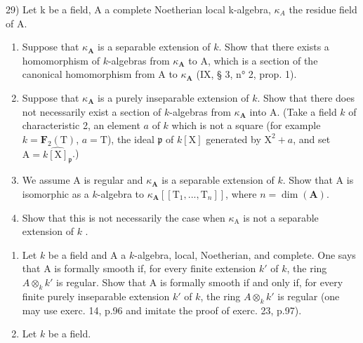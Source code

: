 29) Let k be a field, A a complete Noetherian local k-algebra, \(\kappa_{A}\) the residue field of A.

\begin{enumerate}
\def\labelenumi{\alph{enumi})}
\item
  Suppose that \(\kappa_{\mathbf{A}}\) is a separable extension of \(k\). Show that there exists a homomorphism of \(k\)-algebras from \(\kappa_{\mathbf{A}}\) to A, which is a section of the canonical homomorphism from A to \(\kappa_{\mathbf{A}}\) (IX, § 3, n° 2, prop. 1).
\item
  Suppose that \(\kappa_{\mathbf{A}}\) is a purely inseparable extension of \(k\). Show that there does not necessarily exist a section of \(k\)-algebras from \(\kappa_{\mathbf{A}}\) into A. (Take a field \(k\) of characteristic 2, an element \(a\) of \(k\) which is not a square (for example \(k = \mathbf{F}_2(\mathrm{T})\), \(a = \mathrm{T}\)), the ideal \(\mathfrak{p}\) of \(k[\mathrm{X}]\) generated by \(\mathrm{X}^2 + a\), and set \(\mathrm{A} = \widehat{k[\mathrm{X}]_{\mathfrak{p}}}\).)
\item
  We assume A is regular and \(\kappa_{\mathbf{A}}\) is a separable extension of \(k\). Show that A is isomorphic as a \(k\)-algebra to \(\kappa_{\mathbf{A}}[[\mathrm{T}_{1}, ..., \mathrm{T}_{n}]]\), where \(n = \dim(\mathbf{A})\).
\item
  Show that this is not necessarily the case when \(\kappa_{\mathrm{A}}\) is not a separable extension of \(k\) .
\end{enumerate}

\begin{enumerate}
\def\labelenumi{\arabic{enumi})}
\setcounter{enumi}{29}
\item
  Let \(k\) be a field and A a \(k\)-algebra, local, Noetherian, and complete. One says that A is formally smooth if, for every finite extension \(k'\) of \(k\), the ring \(A \otimes_k k'\) is regular. Show that A is formally smooth if and only if, for every finite purely inseparable extension \(k'\) of \(k\), the ring \(A \otimes_k k'\) is regular (one may use exerc. 14, p.96 and imitate the proof of exerc. 23, p.97).
\item
  Let \(k\) be a field.
\end{enumerate}

